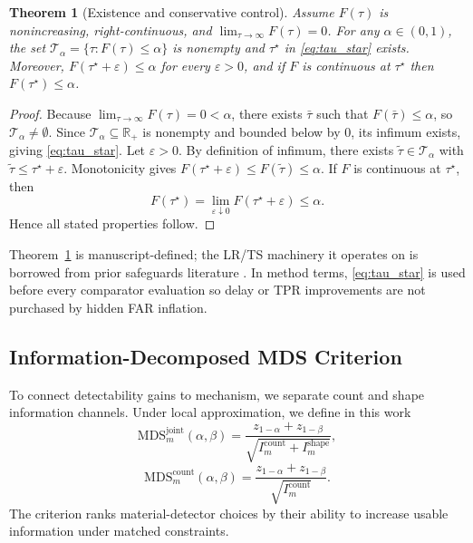 \documentclass{article} %
\newtheorem{theorem}{Theorem}[section]
\begin{document}
\begin{theorem}[Existence and conservative control]\label{thm:tau}
Assume $F(\tau)$ is nonincreasing, right-continuous, and $\lim_{\tau\to\infty}F(\tau)=0$. For any $\alpha\in(0,1)$, the set $\mathcal{T}_\alpha=\{\tau:F(\tau)\le\alpha\}$ is nonempty and $\tau^\star$ in \eqref{eq:tau_star} exists. Moreover, $F(\tau^\star+\varepsilon)\le\alpha$ for every $\varepsilon>0$, and if $F$ is continuous at $\tau^\star$ then $F(\tau^\star)\le\alpha$.
\end{theorem}
\begin{proof}
Because $\lim_{\tau\to\infty}F(\tau)=0<\alpha$, there exists $\bar\tau$ such that $F(\bar\tau)\le\alpha$, so $\mathcal{T}_\alpha\neq\emptyset$. Since $\mathcal{T}_\alpha\subseteq\mathbb{R}_+$ is nonempty and bounded below by $0$, its infimum exists, giving \eqref{eq:tau_star}. Let $\varepsilon>0$. By definition of infimum, there exists $\tilde\tau\in\mathcal{T}_\alpha$ with $\tilde\tau\le\tau^\star+\varepsilon$. Monotonicity gives $F(\tau^\star+\varepsilon)\le F(\tilde\tau)\le\alpha$. If $F$ is continuous at $\tau^\star$, then
\[
F(\tau^\star)=\lim_{\varepsilon\downarrow 0}F(\tau^\star+\varepsilon)\le\alpha.
\]
Hence all stated properties follow.
\end{proof}

Theorem~\ref{thm:tau} is manuscript-defined; the LR/TS machinery it operates on is borrowed from prior safeguards literature \citep{SRC009,SRC017,SRC023}. In method terms, \eqref{eq:tau_star} is used before every comparator evaluation so delay or TPR improvements are not purchased by hidden FAR inflation.

\subsection{Information-Decomposed MDS Criterion}
To connect detectability gains to mechanism, we separate count and shape information channels. Under local approximation, we define in this work
\begin{equation}
\mathrm{MDS}^{\mathrm{joint}}_m(\alpha,\beta)=\frac{z_{1-\alpha}+z_{1-\beta}}{\sqrt{I_m^{\mathrm{count}}+I_m^{\mathrm{shape}}}},
\label{eq:mds_joint}
\end{equation}
\begin{equation}
\mathrm{MDS}^{\mathrm{count}}_m(\alpha,\beta)=\frac{z_{1-\alpha}+z_{1-\beta}}{\sqrt{I_m^{\mathrm{count}}}}.
\label{eq:mds_count}
\end{equation}
The criterion ranks material-detector choices by their ability to increase usable information under matched constraints.
\end{document}
